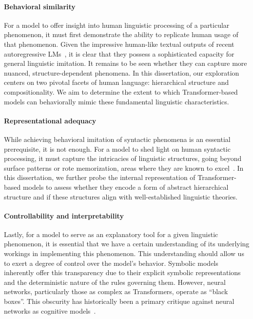 \paragraph{Behavioral similarity} For a model to offer insight into human linguistic processing of a particular phenomenon, it must first demonstrate the ability to replicate human usage of that phenomenon. Given the impressive human-like textual outputs of recent autoregressive LMs~\citep{radford2019language,bubeck2023sparks}, it is clear that they possess a sophisticated capacity for general linguistic imitation. It remains to be seen whether they can capture more nuanced, structure-dependent phenomena. In this dissertation, our exploration centers on two pivotal facets of human language: hierarchical structure and compositionality. We aim to determine the extent to which Transformer-based models can behaviorally mimic these fundamental linguistic characteristics.


\paragraph{Representational adequacy} While achieving behavioral imitation of syntactic phenomena is an essential prerequisite, it is not enough. For a model to shed light on human syntactic processing, it must capture the intricacies of linguistic structures, going beyond surface patterns or rote memorization, areas where they are known to excel~\citep{mccoy-etal-2019-right,kodner-gupta-2020-overestimation}. In this dissertation, we further probe the internal representation of Transformer-based models to assess whether they encode a form of abstract hierarchical structure and if these structures align with well-established linguistic theories. 



\paragraph{Controllability and interpretability} 
 
 Lastly, for a model to serve as an explanatory tool
for a given linguistic phenomenon, it is essential that we have a certain understanding
of its underlying workings in implementing this phenomenon. This understanding should
allow us to exert a degree of control over the model’s behavior.
 Symbolic models inherently offer this transparency due to their explicit symbolic representations and the deterministic nature of the rules governing them. However, neural networks, particularly those as complex as Transformers, operate as ``black boxes''. This obscurity has historically been a primary critique against neural networks as cognitive models~\citep{mccloskey1991networks}. 

